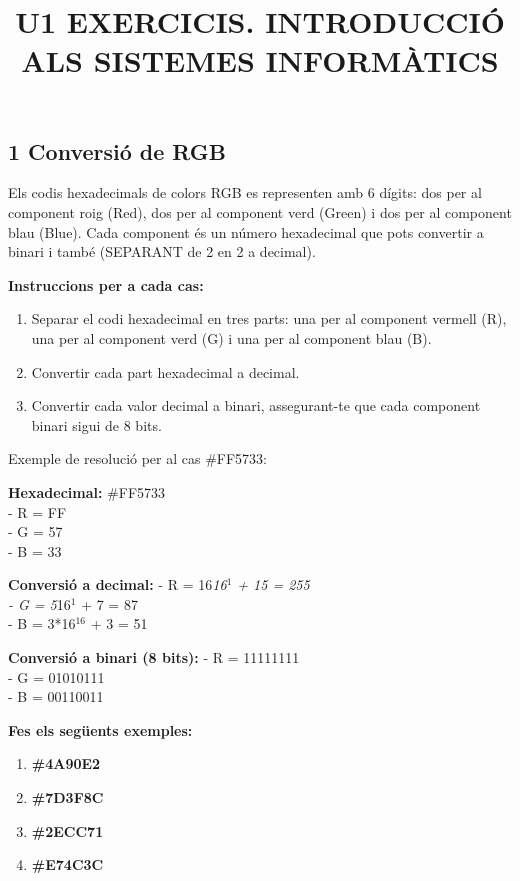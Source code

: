 \documentclass[
  12 pt,
  a4paper,
]{article}
\title{U1 EXERCICIS. INTRODUCCIÓ ALS SISTEMES INFORMÀTICS}
\author{}
\date{\vspace{-2.5em}}
\providecommand{\tightlist}{%
  \setlength{\itemsep}{0pt}\setlength{\parskip}{0pt}}
\begin{document}
\maketitle

{
\setcounter{tocdepth}{2}
\tableofcontents
}
\newpage
\renewcommand\tablename{Tabla}

\subsection{1 Conversió de RGB}\label{conversiuxf3-de-rgb}

Els codis hexadecimals de colors RGB es representen amb 6 dígits: dos
per al component roig (Red), dos per al component verd (Green) i dos per
al component blau (Blue). Cada component és un número hexadecimal que
pots convertir a binari i també (SEPARANT de 2 en 2 a decimal).

\textbf{Instruccions per a cada cas:}

\begin{enumerate}
\def\labelenumi{\arabic{enumi}.}
\tightlist
\item
  Separar el codi hexadecimal en tres parts: una per al component
  vermell (R), una per al component verd (G) i una per al component blau
  (B).
\item
  Convertir cada part hexadecimal a decimal.
\item
  Convertir cada valor decimal a binari, assegurant-te que cada
  component binari sigui de 8 bits.
\end{enumerate}

Exemple de resolució per al cas \#FF5733:

\textbf{Hexadecimal:} \#FF5733\\
- R = FF\\
- G = 57\\
- B = 33

\textbf{Conversió a decimal:} - R = 16\emph{16\(^{1}\) + 15 = 255\\
- G = 5}16\(^{1}\) + 7 = 87\\
- B = 3*16\(^{16}\) + 3 = 51

\textbf{Conversió a binari (8 bits):} - R = 11111111\\
- G = 01010111\\
- B = 00110011

\textbf{Fes els següents exemples:}

\begin{enumerate}
\def\labelenumi{\arabic{enumi}.}
\tightlist
\item
  \textbf{\#4A90E2}\\
\item
  \textbf{\#7D3F8C}\\
\item
  \textbf{\#2ECC71}\\
\item
  \textbf{\#E74C3C}
\end{enumerate}
\end{document}
